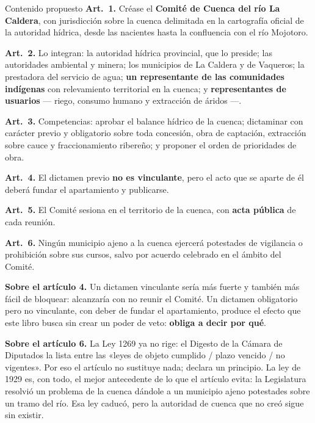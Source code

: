 \begin{ficha}{Contenido propuesto}
\textbf{Art.\ 1.} Créase el \textbf{Comité de Cuenca del río La Caldera}, con jurisdicción
sobre la cuenca delimitada en la cartografía oficial de la autoridad hídrica, desde las
nacientes hasta la confluencia con el río Mojotoro.

\textbf{Art.\ 2.} Lo integran: la autoridad hídrica provincial, que lo preside; las
autoridades ambiental y minera; los municipios de La Caldera y de Vaqueros; la prestadora del
servicio de agua; \textbf{un representante de las comunidades indígenas} con relevamiento
territorial en la cuenca; y \textbf{representantes de usuarios} --- riego, consumo humano y
extracción de áridos ---.

\textbf{Art.\ 3.} Competencias: aprobar el balance hídrico de la cuenca; dictaminar con
carácter previo y obligatorio sobre toda concesión, obra de captación, extracción sobre cauce
y fraccionamiento ribereño; y proponer el orden de prioridades de obra.

\textbf{Art.\ 4.} El dictamen previo \textbf{no es vinculante}, pero el acto que se aparte de
él deberá fundar el apartamiento y publicarse.

\textbf{Art.\ 5.} El Comité sesiona en el territorio de la cuenca, con \textbf{acta pública}
de cada reunión.

\textbf{Art.\ 6.} Ningún municipio ajeno a la cuenca ejercerá potestades de vigilancia o prohibición sobre sus cursos, salvo por acuerdo celebrado en el ámbito del Comité.
\end{ficha}

\begin{cautela}
\textbf{Sobre el artículo 4.} Un dictamen vinculante sería más fuerte y también más fácil de
bloquear: alcanzaría con no reunir el Comité. Un dictamen obligatorio pero no vinculante, con
deber de fundar el apartamiento, produce el efecto que este libro busca sin crear un poder de
veto: \textbf{obliga a decir por qué}.

\textbf{Sobre el artículo 6.} La Ley 1269 ya no rige: el Digesto de la Cámara de Diputados la lista entre las «leyes de objeto cumplido / plazo vencido / no vigentes». Por eso el artículo no sustituye nada; declara un principio. La ley de 1929 es, con todo, el mejor antecedente de lo que el artículo evita: la Legislatura resolvió un problema de la cuenca dándole a un municipio ajeno potestades sobre un tramo del río. Esa ley caducó, pero la autoridad de cuenca que no creó sigue sin existir.
\end{cautela}

